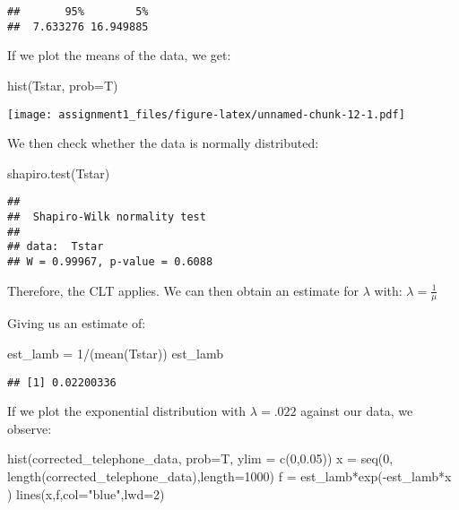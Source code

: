 \documentclass[
]{article}
\newenvironment{Shaded}{\begin{snugshade}}{\end{snugshade}}
\newcommand{\AttributeTok}[1]{\textcolor[rgb]{0.77,0.63,0.00}{#1}}
\newcommand{\DecValTok}[1]{\textcolor[rgb]{0.00,0.00,0.81}{#1}}
\newcommand{\FloatTok}[1]{\textcolor[rgb]{0.00,0.00,0.81}{#1}}
\newcommand{\FunctionTok}[1]{\textcolor[rgb]{0.00,0.00,0.00}{#1}}
\newcommand{\NormalTok}[1]{#1}
\newcommand{\OtherTok}[1]{\textcolor[rgb]{0.56,0.35,0.01}{#1}}
\newcommand{\SpecialCharTok}[1]{\textcolor[rgb]{0.00,0.00,0.00}{#1}}
\newcommand{\StringTok}[1]{\textcolor[rgb]{0.31,0.60,0.02}{#1}}
\begin{document}
\begin{verbatim}
##       95%        5% 
##  7.633276 16.949885
\end{verbatim}

If we plot the means of the data, we get:

\begin{Shaded}
\begin{Highlighting}[]
\FunctionTok{hist}\NormalTok{(Tstar, }\AttributeTok{prob=}\NormalTok{T)}
\end{Highlighting}
\end{Shaded}

\texttt{[image: assignment1\_files/figure-latex/unnamed-chunk-12-1.pdf]}

We then check whether the data is normally distributed:

\begin{Shaded}
\begin{Highlighting}[]
\FunctionTok{shapiro.test}\NormalTok{(Tstar)}
\end{Highlighting}
\end{Shaded}

\begin{verbatim}
## 
##  Shapiro-Wilk normality test
## 
## data:  Tstar
## W = 0.99967, p-value = 0.6088
\end{verbatim}

Therefore, the CLT applies. We can then obtain an estimate for
\(\lambda\) with: \(\lambda = \frac{1}{\mu}\)

Giving us an estimate of:

\begin{Shaded}
\begin{Highlighting}[]
\NormalTok{est\_lamb }\OtherTok{=} \DecValTok{1}\SpecialCharTok{/}\NormalTok{(}\FunctionTok{mean}\NormalTok{(Tstar))}
\NormalTok{est\_lamb}
\end{Highlighting}
\end{Shaded}

\begin{verbatim}
## [1] 0.02200336
\end{verbatim}

If we plot the exponential distribution with \(\lambda = .022\) against
our data, we observe:

\begin{Shaded}
\begin{Highlighting}[]
\FunctionTok{hist}\NormalTok{(corrected\_telephone\_data, }\AttributeTok{prob=}\NormalTok{T, }\AttributeTok{ylim =} \FunctionTok{c}\NormalTok{(}\DecValTok{0}\NormalTok{,}\FloatTok{0.05}\NormalTok{))}
\NormalTok{x }\OtherTok{=} \FunctionTok{seq}\NormalTok{(}\DecValTok{0}\NormalTok{, }\FunctionTok{length}\NormalTok{(corrected\_telephone\_data),}\AttributeTok{length=}\DecValTok{1000}\NormalTok{)}
\NormalTok{f }\OtherTok{=}\NormalTok{ est\_lamb}\SpecialCharTok{*}\FunctionTok{exp}\NormalTok{(}\SpecialCharTok{{-}}\NormalTok{est\_lamb}\SpecialCharTok{*}\NormalTok{x )}
\FunctionTok{lines}\NormalTok{(x,f,}\AttributeTok{col=}\StringTok{"blue"}\NormalTok{,}\AttributeTok{lwd=}\DecValTok{2}\NormalTok{)}
\end{Highlighting}
\end{Shaded}
\end{document}
